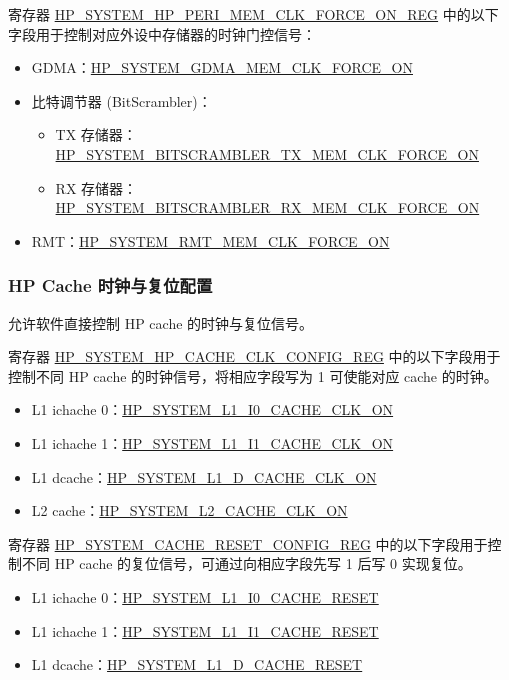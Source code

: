 \documentclass[main\_\_CN.tex]{subfiles}
\begin{document}
寄存器 \hyperref[regdesc:HPSYSTEMHPPERIMEMCLKFORCEONREG]{HP\_SYSTEM\_HP\_PERI\_MEM\_CLK\_FORCE\_ON\_REG} 中的以下字段用于控制对应外设中存储器的时钟门控信号：
\begin{itemize}
    \item GDMA：\hyperref[fielddesc:HPSYSTEMGDMAMEMCLKFORCEON]{HP\_SYSTEM\_GDMA\_MEM\_CLK\_FORCE\_ON}
    \item 比特调节器 (BitScrambler)：
    \begin{itemize}
        \item TX 存储器：\hyperref[fielddesc:HPSYSTEMBITSCRAMBLERTXMEMCLKFORCEON]{HP\_SYSTEM\_BITSCRAMBLER\_TX\_MEM\_CLK\_FORCE\_ON}
        \item RX 存储器：\hyperref[fielddesc:HPSYSTEMBITSCRAMBLERRXMEMCLKFORCEON]{HP\_SYSTEM\_BITSCRAMBLER\_RX\_MEM\_CLK\_FORCE\_ON}
    \end{itemize}
    \item RMT：\hyperref[fielddesc:HPSYSTEMRMTMEMCLKFORCEON]{HP\_SYSTEM\_RMT\_MEM\_CLK\_FORCE\_ON}
\end{itemize}

\subsubsection{HP Cache 时钟与复位配置}

\chipname{} 允许软件直接控制 HP cache 的时钟与复位信号。

寄存器 \hyperref[regdesc:HPSYSTEMHPCACHECLKCONFIGREG]{HP\_SYSTEM\_HP\_CACHE\_CLK\_CONFIG\_REG} 中的以下字段用于控制不同 HP cache 的时钟信号，将相应字段写为 1 可使能对应 cache 的时钟。
\begin{itemize}
    \item L1 ichache 0：\hyperref[fielddesc:HPSYSTEML1I0CACHECLKON]{HP\_SYSTEM\_L1\_I0\_CACHE\_CLK\_ON}
    \item L1 ichache 1：\hyperref[fielddesc:HPSYSTEML1I1CACHECLKON]{HP\_SYSTEM\_L1\_I1\_CACHE\_CLK\_ON}
    \item L1 dcache：\hyperref[fielddesc:HPSYSTEML1DCACHECLKON]{HP\_SYSTEM\_L1\_D\_CACHE\_CLK\_ON}
    \item L2 cache：\hyperref[fielddesc:HPSYSTEML2CACHECLKON]{HP\_SYSTEM\_L2\_CACHE\_CLK\_ON}
\end{itemize}

寄存器 \hyperref[regdesc:HPSYSTEMCACHERESETCONFIGREG]{HP\_SYSTEM\_CACHE\_RESET\_CONFIG\_REG} 中的以下字段用于控制不同 HP cache 的复位信号，可通过向相应字段先写 1 后写 0 实现复位。
\begin{itemize}
    \item L1 ichache 0：\hyperref[fielddesc:HPSYSTEML1I0CACHERESET]{HP\_SYSTEM\_L1\_I0\_CACHE\_RESET}
    \item L1 ichache 1：\hyperref[fielddesc:HPSYSTEML1I1CACHERESET]{HP\_SYSTEM\_L1\_I1\_CACHE\_RESET}
    \item L1 dcache：\hyperref[fielddesc:HPSYSTEML1DCACHERESET]{HP\_SYSTEM\_L1\_D\_CACHE\_RESET}
\end{itemize}
\end{document}
